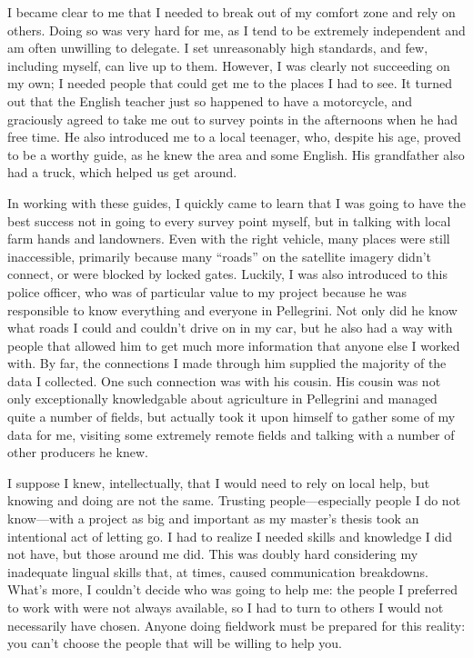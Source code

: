 I became clear to me that I needed to break out of my comfort zone and rely on others. Doing so was very hard for me, as I tend to be extremely independent and am often unwilling to delegate. I set unreasonably high standards, and few, including myself, can live up to them. However, I was clearly not succeeding on my own; I needed people that could get me to the places I had to see. It turned out that the English teacher just so happened to have a motorcycle, and graciously agreed to take me out to survey points in the afternoons when he had free time. He also introduced me to a local teenager, who, despite his age, proved to be a worthy guide, as he knew the area and some English. His grandfather also had a truck, which helped us get around.

In working with these guides, I quickly came to learn that I was going to have the best success not in going to every survey point myself, but in talking with local farm hands and landowners. Even with the right vehicle, many places were still inaccessible, primarily because many “roads” on the satellite imagery didn’t connect, or were blocked by locked gates. Luckily, I was also introduced to this police officer, who was of particular value to my project because he was responsible to know everything and everyone in Pellegrini. Not only did he know what roads I could and couldn’t drive on in my car, but he also had a way with people that allowed him to get much more information that anyone else I worked with. By far, the connections I made through him supplied the majority of the data I collected. One such connection was with his cousin. His cousin was not only exceptionally knowledgable about agriculture in Pellegrini and managed quite a number of fields, but actually took it upon himself to gather some of my data for me, visiting some extremely remote fields and talking with a number of other producers he knew.

I suppose I knew, intellectually, that I would need to rely on local help, but knowing and doing are not the same. Trusting people---especially people I do not know---with a project as big and important as my master’s thesis took an intentional act of letting go. I had to realize I needed skills and knowledge I did not have, but those around me did. This was doubly hard considering my inadequate lingual skills that, at times, caused communication breakdowns. What’s more, I couldn’t decide who was going to help me: the people I preferred to work with were not always available, so I had to turn to others I would not necessarily have chosen. Anyone doing fieldwork must be prepared for this reality: you can’t choose the people that will be willing to help you.

